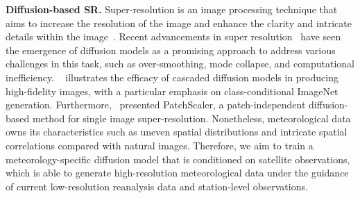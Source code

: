 \textbf{Diffusion-based SR.}
Super-resolution is an image processing technique that aims to increase the resolution of the image and enhance the clarity and intricate details within the image~\cite{tu2024taming}. 
Recent advancements in super resolution~\cite{li2022srdiff,liu2022diffusion,gao2023implicit} have seen the emergence of diffusion models as a promising approach to address various challenges in this task, such as over-smoothing, mode collapse, and computational inefficiency. 
~\cite{ho2022cascaded} illustrates the efficacy of cascaded diffusion models in producing high-fidelity images, with a particular emphasis on class-conditional ImageNet generation.
Furthermore,~\cite{liu2024patchscaler} presented PatchScaler, a patch-independent diffusion-based method for single image super-resolution. 
Nonetheless, meteorological data owns its characteristics such as uneven spatial distributions and intricate spatial correlations compared with natural images.
Therefore, we aim to train a meteorology-specific diffusion model that is conditioned on satellite observations, which is able to generate high-resolution meteorological data under the guidance of current low-resolution reanalysis data and station-level observations.